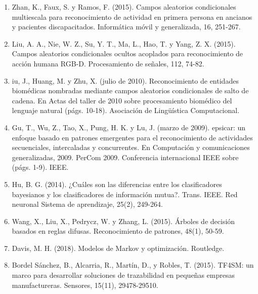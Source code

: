 \documentclass{article}
\begin{document}
\begin{enumerate}
	\item	Zhan, K., Faux, S. y Ramos, F. (2015). Campos aleatorios condicionales multiescala para reconocimiento de actividad en primera persona en ancianos y pacientes discapacitados. Informática móvil y generalizada, 16, 251-267.
	\item	Liu, A. A., Nie, W. Z., Su, Y. T., Ma, L., Hao, T. y Yang, Z. X. (2015). Campos aleatorios condicionales ocultos acoplados para reconocimiento de acción humana RGB-D. Procesamiento de señales, 112, 74-82.
	\item	iu, J., Huang, M. y Zhu, X. (julio de 2010). Reconocimiento de entidades biomédicas nombradas mediante campos aleatorios condicionales de salto de cadena. En Actas del taller de 2010 sobre procesamiento biomédico del lenguaje natural (págs. 10-18). Asociación de Lingüística Computacional.
	\item	Gu, T., Wu, Z., Tao, X., Pung, H. K. y Lu, J. (marzo de 2009). epsicar: un enfoque basado en patrones emergentes para el reconocimiento de actividades secuenciales, intercaladas y concurrentes. En Computación y comunicaciones generalizadas, 2009. PerCom 2009. Conferencia internacional IEEE sobre (págs. 1-9). IEEE.
	\item	Hu, B. G. (2014). ¿Cuáles son las diferencias entre los clasificadores bayesianos y los clasificadores de información mutua?. Trans. IEEE. Red neuronal Sistema de aprendizaje, 25(2), 249-264.
	\item	Wang, X., Liu, X., Pedrycz, W. y Zhang, L. (2015). Árboles de decisión basados en reglas difusas. Reconocimiento de patrones, 48(1), 50-59.
	\item	Davis, M. H. (2018). Modelos de Markov y    optimización. Routledge.
	\item Bordel Sánchez, B., Alcarria, R., Martín,   D., y Robles, T. (2015). TF4SM: un marco            para desarrollar soluciones de trazabilidad         en pequeñas empresas manufactureras.                Sensores, 15(11), 29478-29510.
\end{enumerate}
\end{document}
